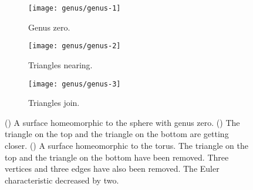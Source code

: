\begin{figure}[htb]
        \centering
        \begin{subfigure}[b]{0.2\textwidth}
        \texttt{[image: genus/genus-1]}
        \caption{Genus zero.}
          \label{fig:initial-sphere}
        \end{subfigure}
          \hspace{.5cm}
         \begin{subfigure}[b]{0.2\textwidth}
        \texttt{[image: genus/genus-2]}
        \caption{Triangles nearing.}
        \label{fig:decending-faces}
        \end{subfigure}
          \hspace{.5cm}
         \begin{subfigure}[b]{0.2\textwidth}
        \texttt{[image: genus/genus-3]}
        \caption{Triangles join.}
        \label{fig:faces-join}
        \end{subfigure}
		\caption{() A surface homeomorphic to the sphere with genus zero.
		() The triangle on the top and the triangle on the bottom are getting
		closer. ()  A surface homeomorphic to the torus. The triangle on the top
		and the triangle on the bottom have been removed. Three vertices and three edges have also been
		removed. The Euler characteristic decreased by two.
		\label{fig:genus}}
\end{figure}
